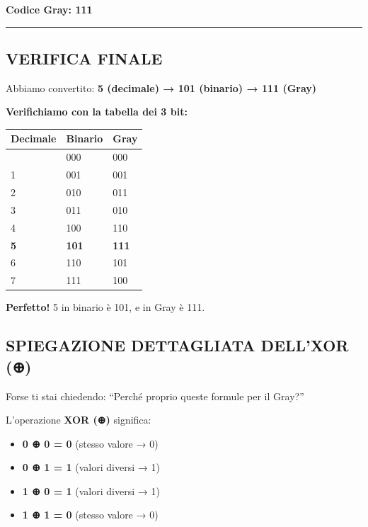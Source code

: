 \documentclass[
]{article}
\providecommand{\tightlist}{%
  \setlength{\itemsep}{0pt}\setlength{\parskip}{0pt}}
\begin{document}
\textbf{Codice Gray: 111}

\begin{center}\rule{0.5\linewidth}{0.5pt}\end{center}

\hypertarget{verifica-finale}{%
\subsection{\texorpdfstring{\textbf{VERIFICA FINALE}}{VERIFICA FINALE}}\label{verifica-finale}}

Abbiamo convertito: \textbf{5 (decimale) → 101 (binario) → 111 (Gray)}

\textbf{Verifichiamo con la tabella dei 3 bit:}

\begin{longtable}[]{@{}lll@{}}
\toprule\noalign{}
Decimale & Binario & Gray \\
\midrule\noalign{}
\endhead
\bottomrule\noalign{}
\endlastfoot
0 & 000 & 000 \\
1 & 001 & 001 \\
2 & 010 & 011 \\
3 & 011 & 010 \\
4 & 100 & 110 \\
\textbf{5} & \textbf{101} & \textbf{111} \\
6 & 110 & 101 \\
7 & 111 & 100 \\
\end{longtable}

\textbf{Perfetto!} 5 in binario è 101, e in Gray è 111.

\hypertarget{spiegazione-dettagliata-dellxor}{%
\subsection{\texorpdfstring{\textbf{SPIEGAZIONE DETTAGLIATA DELL'XOR (⊕)}}{SPIEGAZIONE DETTAGLIATA DELL'XOR (⊕)}}\label{spiegazione-dettagliata-dellxor}}

Forse ti stai chiedendo: ``Perché proprio queste formule per il Gray?''

L'operazione \textbf{XOR (⊕)} significa:

\begin{itemize}
\tightlist
\item
  \textbf{0 ⊕ 0 = 0} (stesso valore → 0)
\item
  \textbf{0 ⊕ 1 = 1} (valori diversi → 1)
\item
  \textbf{1 ⊕ 0 = 1} (valori diversi → 1)
\item
  \textbf{1 ⊕ 1 = 0} (stesso valore → 0)
\end{itemize}
\end{document}
